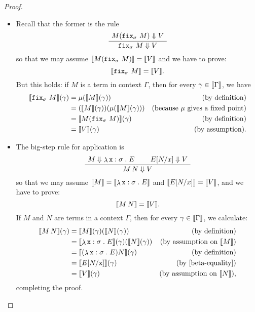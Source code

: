 \begin{proof}
  \begin{itemize}
  \item Recall that the former is the rule
  \[
    \AxiomC{\(M(\pcffix_{\sigma} \, M) \bigstep V\)}
    \UnaryInfC{\({\pcffix_{\sigma} \, M} \bigstep V\)}
    \DisplayProof
  \]
  so that we may assume \(\llbracket M(\operatorname{\mathtt{fix}}_\sigma\,M)\rrbracket = \llbracket V\rrbracket\) and we
  have to prove:
  \[
    \llbracket\operatorname{\mathtt{fix}}_{\sigma} \, M\rrbracket = \llbracket V\rrbracket.
  \]
  But this holds: if \(M\) is a term in context \(\Gamma\), then for
  every \(\gamma \in \llbracket\Gamma\rrbracket\), we have
  \begin{align*}
    \densem{\pcffix_{\sigma} \,M}(\gamma)
    &= \mu\pa*{\densem{M}(\gamma)}
    &\text{(by definition)} \\
    &= \pa*{\densem{M}(\gamma)}\pa*{\mu\pa*{\densem{M}(\gamma)}}
    &\text{(because \(\mu\) gives a fixed point)} \\
    &= \densem{M\pa*{\pcffix_{\sigma}\,M}}(\gamma)
    &\text{(by definition)} \\
    &= \densem{V}(\gamma) &\text{(by assumption)}.
  \end{align*}
  \item   The big-step rule for application is
  \[
    \AxiomC{\(M \bigstep \lambdadot{\var x : \sigma}{E}\)}
    \AxiomC{\(E[N/x] \bigstep V\)}
    \BinaryInfC{\(M \, N \bigstep V\)}
    \DisplayProof
  \]
  so that we may assume
  \(\llbracket M\rrbracket = \llbracket\mathop{\lambda}{\mathtt x : \sigma}\mathrel{.}E\rrbracket\)
  and
  \(\llbracket E[N/x]\rrbracket = \llbracket V\rrbracket\),
  and we have to prove:
  \[
    \llbracket M \, N\rrbracket = \llbracket V\rrbracket.
  \]
  If \(M\) and \(N\) are terms in a context \(\Gamma\), then for every
  \(\gamma \in \llbracket\Gamma\rrbracket\), we calculate:
  \begin{align*}
    \densem{M \, N}(\gamma)
    &= \densem{M}(\gamma)\pa*{\densem{N}(\gamma)}
    &\text{(by definition)} \\
    &= \densem{\lambdadot{\var x : \sigma}{E}}(\gamma)\pa*{\densem{N}(\gamma)}
    &\text{(by assumption on \(\densem{M}\))} \\
    &= \densem*{\pa*{\lambdadot{\var x : \sigma}{E}}N}(\gamma)
    &\text{(by definition)} \\
    &= \densem{E[N/\var x]}(\gamma)
    &\text{(by \cref{beta-equality})} \\
    &= \densem{V}(\gamma)
    &\text{(by assumption on \(\densem{N}\))},
  \end{align*}
  completing the proof. \qedhere
  \end{itemize}
\end{proof}

